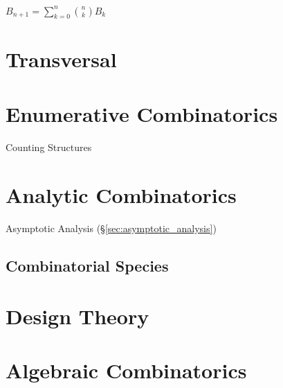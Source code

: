 $B_{n+1} = \sum_{k=0}^n \binom{n}{k} B_k$



\section{Transversal}\label{sec:transversal}

\section{Enumerative Combinatorics}
\label{sec:enumerative_combinatorics}

Counting Structures



\section{Analytic Combinatorics}\label{sec:analytic_combinatorics}
\cite{flajolet-sedgewick09}

Asymptotic Analysis (\S\ref{sec:asymptotic_analysis})



\subsection{Combinatorial Species}\label{sec:combinatorial_species}



\section{Design Theory}\label{sec:combinatorial_design}

\section{Algebraic Combinatorics}\label{sec:algebraic_combinatorics}

